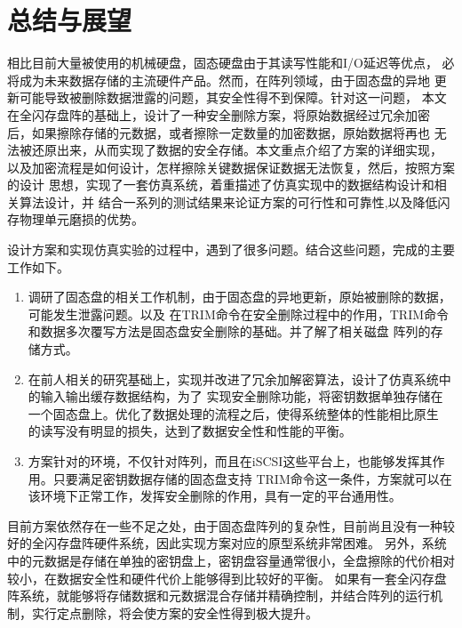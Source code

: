 \chapter{总结与展望}
相比目前大量被使用的机械硬盘，固态硬盘由于其读写性能和I/O延迟等优点，
必将成为未来数据存储的主流硬件产品。然而，在阵列领域，由于固态盘的异地
更新可能导致被删除数据泄露的问题，其安全性得不到保障。针对这一问题，
本文在全闪存盘阵的基础上，设计了一种安全删除方案，将原始数据经过冗余加密
后，如果擦除存储的元数据，或者擦除一定数量的加密数据，原始数据将再也
无法被还原出来，从而实现了数据的安全存储。本文重点介绍了方案的详细实现，
以及加密流程是如何设计，怎样擦除关键数据保证数据无法恢复，然后，按照方案的设计
思想，实现了一套仿真系统，着重描述了仿真实现中的数据结构设计和相关算法设计，并
结合一系列的测试结果来论证方案的可行性和可靠性,以及降低闪存物理单元磨损的优势。


设计方案和实现仿真实验的过程中，遇到了很多问题。结合这些问题，完成的主要工作如下。
\begin{enumerate}
        \item 调研了固态盘的相关工作机制，由于固态盘的异地更新，原始被删除的数据，可能发生泄露问题。以及
        在TRIM命令在安全删除过程中的作用，TRIM命令和数据多次覆写方法是固态盘安全删除的基础。并了解了相关磁盘
        阵列的存储方式。
        \item 在前人相关的研究基础上，实现并改进了冗余加解密算法，设计了仿真系统中的输入输出缓存数据结构，为了
        实现安全删除功能，将密钥数据单独存储在一个固态盘上。优化了数据处理的流程之后，使得系统整体的性能相比原生
        的读写没有明显的损失，达到了数据安全性和性能的平衡。
        \item 方案针对的环境，不仅针对阵列，而且在iSCSI这些平台上，也能够发挥其作用。只要满足密钥数据存储的固态盘支持
        TRIM命令这一条件，方案就可以在该环境下正常工作，发挥安全删除的作用，具有一定的平台通用性。
\end{enumerate}


目前方案依然存在一些不足之处，由于固态盘阵列的复杂性，目前尚且没有一种较好的全闪存盘阵硬件系统，因此实现方案对应的原型系统非常困难。
另外，系统中的元数据是存储在单独的密钥盘上，密钥盘容量通常很小，全盘擦除的代价相对较小，在数据安全性和硬件代价上能够得到比较好的平衡。
如果有一套全闪存盘阵系统，就能够将存储数据和元数据混合存储并精确控制，并结合阵列的运行机制，实行定点删除，将会使方案的安全性得到极大提升。
